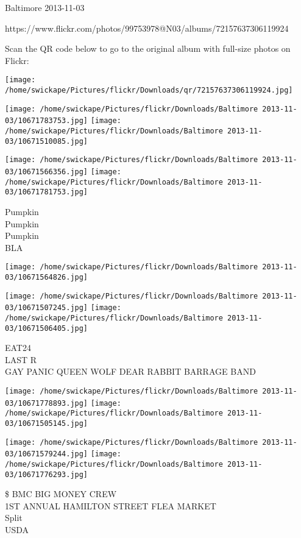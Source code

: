 \documentclass[10pt,letterpaper]{article}
\begin{document}
Baltimore 2013-11-03

https://www.flickr.com/photos/99753978@N03/albums/72157637306119924

Scan the QR code below to go to the original album with full-size photos on Flickr:

\texttt{[image: /home/swickape/Pictures/flickr/Downloads/qr/72157637306119924.jpg]}
\pagebreak

\texttt{[image: /home/swickape/Pictures/flickr/Downloads/Baltimore 2013-11-03/10671783753.jpg]}
\texttt{[image: /home/swickape/Pictures/flickr/Downloads/Baltimore 2013-11-03/10671510085.jpg]}

\texttt{[image: /home/swickape/Pictures/flickr/Downloads/Baltimore 2013-11-03/10671566356.jpg]}
\texttt{[image: /home/swickape/Pictures/flickr/Downloads/Baltimore 2013-11-03/10671781753.jpg]}

Pumpkin\\
Pumpkin\\
Pumpkin\\
BLA\\
\pagebreak

\texttt{[image: /home/swickape/Pictures/flickr/Downloads/Baltimore 2013-11-03/10671564826.jpg]}

\vspace{0.25in}
\texttt{[image: /home/swickape/Pictures/flickr/Downloads/Baltimore 2013-11-03/10671507245.jpg]}
\texttt{[image: /home/swickape/Pictures/flickr/Downloads/Baltimore 2013-11-03/10671506405.jpg]}

EAT24\\
LAST R\\
GAY PANIC QUEEN WOLF DEAR RABBIT BARRAGE BAND\\
\pagebreak

\texttt{[image: /home/swickape/Pictures/flickr/Downloads/Baltimore 2013-11-03/10671778893.jpg]}
\texttt{[image: /home/swickape/Pictures/flickr/Downloads/Baltimore 2013-11-03/10671505145.jpg]}

\texttt{[image: /home/swickape/Pictures/flickr/Downloads/Baltimore 2013-11-03/10671579244.jpg]}
\texttt{[image: /home/swickape/Pictures/flickr/Downloads/Baltimore 2013-11-03/10671776293.jpg]}

\$ BMC BIG MONEY CREW\\
1ST ANNUAL HAMILTON STREET FLEA MARKET\\
Split\\
USDA\\
\pagebreak
\end{document}
